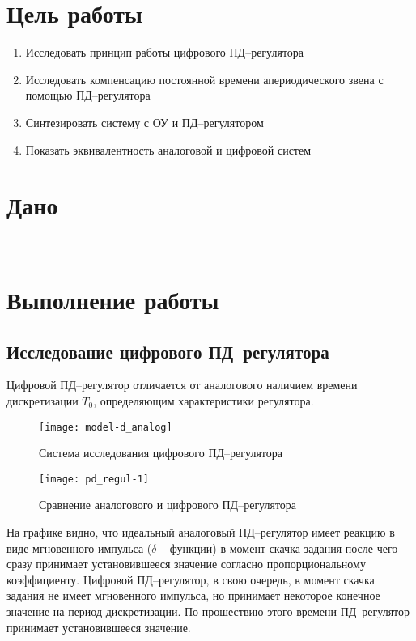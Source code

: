 


    
    \setcounter{page}{2}

    \section{Цель работы}
        \begin{enumerate}
            \item Исследовать принцип работы цифрового ПД--регулятора
            \item Исследовать компенсацию постоянной времени апериодического звена с помощью ПД--регулятора
            \item Синтезировать систему с ОУ и ПД--регулятором
            \item Показать эквивалентность аналоговой и цифровой систем
        \end{enumerate}

    \section{Дано}
        \begin{center}
            \noindent{}\\
        \end{center}

    \section{Выполнение работы}
        \subsection{Исследование цифрового ПД--регулятора}
            Цифровой ПД--регулятор отличается от аналогового наличием времени дискретизации $T_0$,
            определяющим характеристики регулятора.
            \begin{figure}[H]
                \centering\texttt{[image: model-d\_analog]}
                \caption{Система исследования цифрового ПД--регулятора}
            \end{figure}
            \begin{figure}[H]
                \centering\texttt{[image: pd\_regul-1]}
                \caption{Сравнение аналогового и цифрового ПД--регулятора}
                
            \end{figure}
            На графике видно, что идеальный аналоговый ПД--регулятор имеет реакцию в виде мгновенного импульса ($ \delta $ -- функции) в момент скачка задания после чего сразу принимает установившееся значение согласно пропорциональному коэффициенту.
            Цифровой ПД--регулятор, в свою очередь, в момент скачка задания не имеет мгновенного импульса, но принимает некоторое конечное значение на период дискретизации. По прошествию этого времени ПД--регулятор принимает установившееся значение.
        
